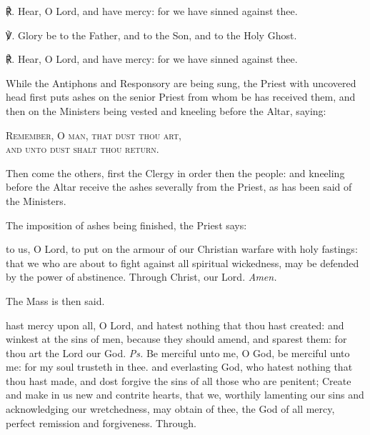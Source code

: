 ℟. Hear, O Lord, and have mercy: for we have sinned against thee.\par
℣. Glory be to the Father, and to the Son, and to the Holy Ghost.\par
℟. Hear, O Lord, and have mercy: for we have sinned against thee.\par
\begin{rubric}
    While the Antiphons and Responsory are being sung, the Priest with uncovered head first puts ashes on the senior Priest from whom be has received them, and then on the Ministers being vested and kneeling before the Altar, saying:
\end{rubric}
\begin{center}
    \textsc{Remember, O man, that dust thou art,\\and unto dust shalt thou return.}
\end{center}
\begin{rubric}
    Then come the others, first the Clergy in order then the people: and kneeling before the Altar receive the ashes severally from the Priest, as has been said of the Ministers.
\end{rubric}
\begin{rubric}
    The imposition of ashes being finished, the Priest says:
\end{rubric}
{} to us, O Lord, to put on the armour of our Christian warfare with holy fastings: that we who are about to fight against all spiritual wickedness, may be defended by the power of abstinence. Through Christ, our Lord. \textit{Amen.}
\begin{rubric}
    The Mass is then said.
\end{rubric}

\introit\label{AshWednesdayMass}
 hast mercy upon all, O Lord, and hatest nothing that thou hast created: and winkest at the sins of men, because they should amend, and sparest them: for thou art the Lord our God. \textit{Ps.} Be merciful unto me, O God, be merciful unto me: for my soul trusteth in thee.
\collect\label{AshWednesdayMassCollect}
 and everlasting God, who hatest nothing that thou hast made, and dost forgive the sins of all those who are penitent; Create and make in us new and contrite hearts, that we, worthily lamenting our sins and acknowledging our wretchedness, may obtain of thee, the God of all mercy, perfect remission and forgiveness. Through.

